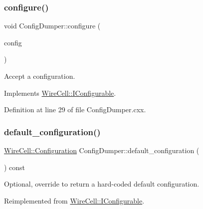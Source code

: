 \subsubsection{\texorpdfstring{configure()}{configure()}}
{\footnotesize\ttfamily void Config\+Dumper\+::configure (\begin{DoxyParamCaption}\item[{const \hyperlink{namespace_wire_cell_a9f705541fc1d46c608b3d32c182333ee}{Wire\+Cell\+::\+Configuration} \&}]{config }\end{DoxyParamCaption})\hspace{0.3cm}{\ttfamily [virtual]}}



Accept a configuration. 



Implements \hyperlink{class_wire_cell_1_1_i_configurable_a57ff687923a724093df3de59c6ff237d}{Wire\+Cell\+::\+I\+Configurable}.



Definition at line 29 of file Config\+Dumper.\+cxx.

\mbox{\label{class_wire_cell_apps_1_1_config_dumper_ad35cbc138044fd7a491402c54b0b9e50}} 
\subsubsection{\texorpdfstring{default\+\_\+configuration()}{default\_configuration()}}
{\footnotesize\ttfamily \hyperlink{namespace_wire_cell_a9f705541fc1d46c608b3d32c182333ee}{Wire\+Cell\+::\+Configuration} Config\+Dumper\+::default\+\_\+configuration (\begin{DoxyParamCaption}{ }\end{DoxyParamCaption}) const\hspace{0.3cm}{\ttfamily [virtual]}}



Optional, override to return a hard-\/coded default configuration. 



Reimplemented from \hyperlink{class_wire_cell_1_1_i_configurable_a54841b2da3d1ea02189478bff96f7998}{Wire\+Cell\+::\+I\+Configurable}.




